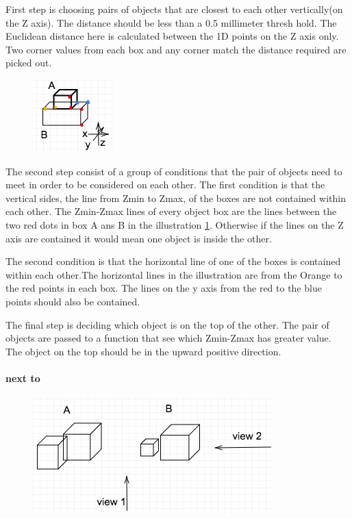 First step is choosing pairs of objects that are closest to each other vertically(on the Z axis). The distance should be less than a 0.5 millimeter thresh hold. The Euclidean distance here is calculated between the 1D points on the Z axis only. Two corner values from each box and any corner match the distance required are picked out. 

\begin{figure}[H]
\centering
\includegraphics[scale=0.7]{images/on.png}
\caption{}
\label{fig:on}
\end{figure}


The second step consist of a group of conditions that the pair of objects need to meet in order to be considered on each other. The first condition is that the vertical sides, the line from Zmin to Zmax, of the boxes are not contained within each other. The Zmin-Zmax lines of every object box are the lines between the two red dots in box A ans B in the illustration \ref{fig:on}. Otherwise if the lines on the Z axis are contained it would mean one object is inside the other. 

The second condition is that the horizontal line of one of the boxes is contained within each other.The horizontal lines in the illustration are from the Orange to the red points in each box. The lines on the y axis from the red to the blue points should also be contained. 

The final step is deciding which object is on the top of the other. The pair of objects are passed to a function that see which Zmin-Zmax has greater value. The object on the top should be in the upward positive direction. 


\paragraph{next to}


\begin{figure}[H]
\centering
\includegraphics[scale=0.5]{images/Nextview.png}
\caption{}
\label{fig:next}
\end{figure}


